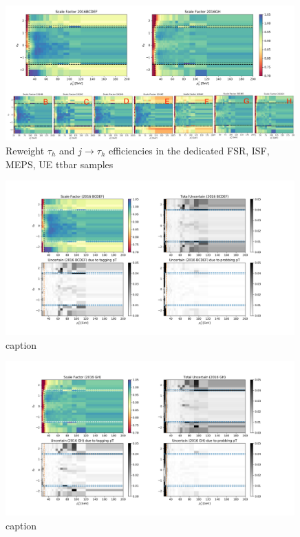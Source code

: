 \begin{figure}
    \centering
    \includegraphics[width=0.99\textwidth]{chapters/Appendix/sectionEleTrigger/figures/eTrSF_value.png}
    \caption{Reweight $\tau_h$ and $j \to \tau_h$ efficiencies in the dedicated FSR, ISF, MEPS, UE ttbar samples}
    \label{fig:appendix:ele27SF}
\end{figure}





\begin{figure}
    \centering
    \includegraphics[width=0.99\textwidth]{chapters/Appendix/sectionEleTrigger/figures/result_BCDEF.png}
    
    \caption{caption}
    \label{fig:appendix:ele27SF}
\end{figure}

\begin{figure}
    \centering
    \includegraphics[width=0.99\textwidth]{chapters/Appendix/sectionEleTrigger/figures/result_GH.png}
    
    \caption{caption}
    \label{fig:appendix:ele27SF}
\end{figure}
